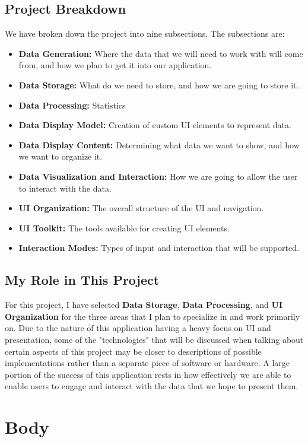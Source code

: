 \documentclass[onecolumn, draftclsnofoot,10pt, compsoc]{IEEEtran}
\begin{document}
\subsection{Project Breakdown}
We have broken down the project into nine subsections. The subsections are: 
\begin{itemize}
    \item \textbf{Data Generation:} Where the data that we will need to work with will come from, and how we plan to get it into our application.
    \item \textbf{Data Storage:} What do we need to store, and how we are going to store it.
    \item \textbf{Data Processing:} Statistics
    \item \textbf{Data Display Model:} Creation of custom UI elements to represent data.
    \item \textbf{Data Display Content:} Determining what data we want to show, and how we want to organize it.
    \item \textbf{Data Visualization and Interaction:} How we are going to allow the user to interact with the data.
    \item \textbf{UI Organization:} The overall structure of the UI and navigation.
    \item \textbf{UI Toolkit:} The tools available for creating UI elements.
    \item \textbf{Interaction Modes:} Types of input and interaction that will be supported.
\end{itemize}

\subsection{My Role in This Project}
For this project, I have selected \textbf{Data Storage}, \textbf{Data Processing}, and \textbf{UI Organization} for the three areas that I plan to specialize in and work primarily on. Due to the nature of this application having a heavy focus on UI and presentation, some of the "technologies" that will be discussed when talking about certain aspects of this project may be closer to descriptions of possible implementations rather than a separate piece of software or hardware. A large portion of the success of this application rests in how effectively we are able to enable users to engage and interact with the data that we hope to present them.


\clearpage

\section{Body}
\end{document}
